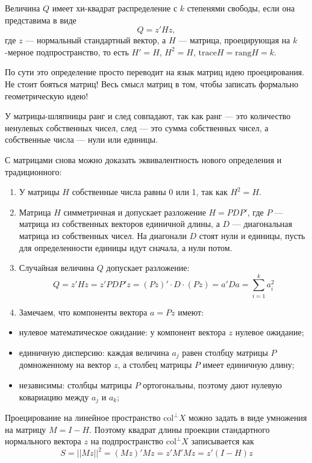 \documentclass[11pt,russian,]{article}
\providecommand{\tightlist}{%
  \setlength{\itemsep}{0pt}\setlength{\parskip}{0pt}}
\newcommand{\1}{\mathbbm{1}}
\newcommand{\col}{\mathcal{col}}
\newcommand{\colp}{\col^{\perp}}
\renewcommand{\col}{\mathrm{col}}
\newcommand{\trace}{\mathrm{trace}}
\newcommand{\rang}{\mathrm{rang}}
\begin{document}
Величина \(Q\) имеет хи-квадрат распределение с \(k\) степенями свободы,
если она представима в виде \[
Q = z'Hz,
\] где \(z\) --- нормальный стандартный вектор, а \(H\) --- матрица,
проецирующая на \(k\)-мерное подпространство, то есть \(H'=H\),
\(H^2=H\), \(\trace H =\rang H= k\).

По сути это определение просто переводит на язык матриц идею
проецирования. Не стоит бояться матриц! Весь смысл матриц в том, чтобы
записать формально геометрическую идею!

У матрицы-шляпницы ранг и след совпадают, так как ранг --- это
количество ненулевых собственных чисел, след --- это сумма собственных
чисел, а собственные числа --- нули или единицы.

С матрицами снова можно доказать эквивалентность нового определения и
традиционного:

\begin{enumerate}
\def\labelenumi{\arabic{enumi}.}
\item
  У матрицы \(H\) собственные числа равны 0 или 1, так как \(H^2=H\).
\item
  Матрица \(H\) симметричная и допускает разложение \(H = PDP'\), где
  \(P\) --- матрица из собственных векторов единичной длины, а \(D\) ---
  диагональная матрица из собственных чисел. На диагонали \(D\) стоят
  нули и единицы, пусть для определенности единицы идут сначала, а нули
  потом.
\item
  Случайная величина \(Q\) допускает разложение: \[
  Q=z'Hz=z'PDP'z=(Pz)'\cdot D\cdot (Pz) = a'Da=\sum_{i=1}^k a_i^2
  \]
\item
  Замечаем, что компоненты вектора \(a=Pz\) имеют:
\end{enumerate}

\begin{itemize}
\tightlist
\item
  нулевое математическое ожидание: у компонент вектора \(z\) нулевое
  ожидание;
\item
  единичную дисперсию: каждая величина \(a_j\) равен столбцу матрицы
  \(P\) домноженному на вектор \(z\), а столбец матрицы \(P\) имеет
  единичную длину;
\item
  независимы: столбцы матрицы \(P\) ортогональны, поэтому дают нулевую
  ковариацию между \(a_j\) и \(a_k\);
\end{itemize}

Проецирование на линейное пространство \(\colp X\) можно задать в виде
умножения на матрицу \(M = I - H\). Поэтому квадрат длины проекции
стандартного нормального вектора \(z\) на подпространство \(\colp X\)
записывается как \[
S = ||Mz||^2 = (Mz)'Mz=z'M'Mz=z'(I-H)z
\]
\end{document}

